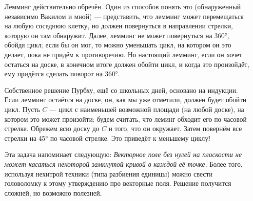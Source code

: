 Лемминг действительно обречён.
Один из способов понять это (обнаруженный независимо Вакилом и мной) --- представить, что лемминг может перемещаться на любую соседнюю клетку, но должен повернуться в направлении стрелки, которую он там обнаружит.
Далее, лемминг не может повернуться на 360°, обойдя цикл;
если бы он мог, то можно уменьшать цикл, на котором он это делает, пока не придём к противоречию.
Но настоящий лемминг, если он хочет остаться на доске, в конечном итоге должен обойти цикл, и когда это произойдёт, ему придётся сделать поворот на 360°.

Собственное решение Пурбху, ещё со школьных дней, основано на индукции.
Если лемминг остаётся на доске, он, как мы уже отметили, должен будет обойти цикл.
Пусть $C$ --- цикл с наименьшей возможной площади (на любой доске), на котором это может произойти; будем считать, что леминг обходит его по часовой стрелке.
Обрежем всю доску до $C$ и того, что он окружает.
Затем повернём все стрелки на 45° по часовой стрелке.
Это приведёт к меньшему циклу!

\begin{addedbytheeditors}
Эта задача напоминает следующую: \emph{Векторное поле без нулей на плоскости не может касаться некоторой замкнутой кривой в каждой её точке.}
Более того, используя нехитрой техники (типа разбиения единицы) можно свести головоломку к этому утверждению про векторные поля.
Решение получится сложней, но возможно полезней.
\end{addedbytheeditors}

